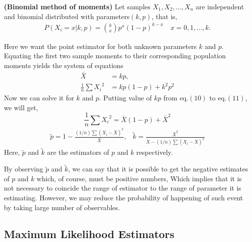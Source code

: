 \documentclass[a4paper,english,12pt]{article}
\begin{document}
\begin{exmp}\textbf{(Binomial method of moments)}
Let samples $X_1,X_2,...,X_n$ are independent and binomial distributed with parameters$(k,p)$, that is,
\begin{align}
P(X_i=x|k,p) = {{k}\choose{x}}p^x(1-p)^{k-x}\,\,\,\,\,\,x=0,1,...,k.
\end{align} 

Here we want the point estimator for both unknown parameters $k$ and $p$.
Equating the first two sample moments to their corresponding population moments yields the system of equations
\begin{align}
\bar{X} &= kp,\\
\frac{1}{n}\sum{X_i}^2 &= kp(1-p) + k^2p^2
\end{align} 
Now we can solve it  for $k$ and $p$. Putting value of $kp$ from eq.$(10)$ to eq.$(11)$, we will get,
$$\frac{1}{n}\sum{X_i}^2 = \bar{X}(1-p) + \bar{X}^2$$
\begin{align}
\tilde{p}=1-\frac{(1/n)\sum{(X_i - \bar{X})}^2}{\bar{X}} ,     \,\,\,\,\,\tilde{k} = \frac{\bar{X}^2}{\bar{X}-(1/n)\sum{(X_i - \bar{X})}^2}
\end{align} 
Here, $\tilde{p}$ and $\tilde{k}$ are the estimators of $p$ and $k$ respectively.

By observing $\tilde{p}$ and $\tilde{k}$, we can say that it is possible to get the negative estimates of $p$ and $k$ which, of course, must be positive numbers, Which implies that it is not necessary to coincide the range of estimator to the range of parameter it is estimating. However, we may reduce the probability of happening of such event by taking large number of observables.   
\end{exmp}

\subsection{Maximum Likelihood Estimators}
\end{document}

